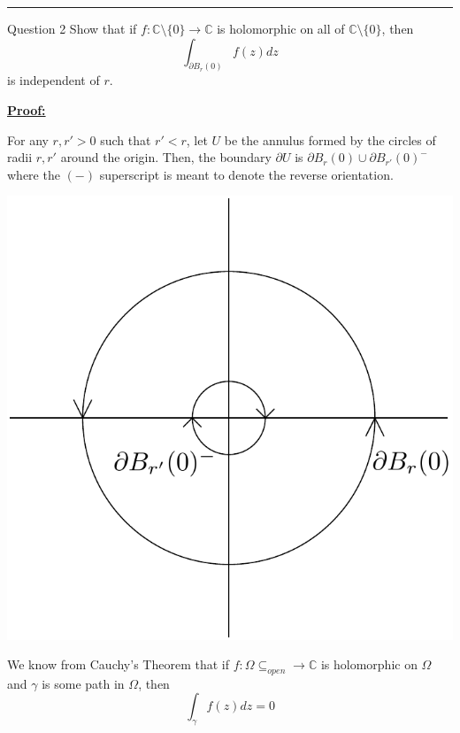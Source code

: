 \documentclass{article}
\newcommand{\C}{\mathbb{C}}
\begin{document}
\vskip 0.5cm
\hrule 
\vskip 0.5cm




\begin{mathdefinitionbox}{Question 2}
\vskip 0.5cm
Show that if $f : \C \setminus \{0\}  \rightarrow \C$ is holomorphic on all of $\C \setminus \{0\}$, then
\[ \int_{\partial B_r(0)} f(z)dz \]
is independent of $r$.
\end{mathdefinitionbox}

\vskip 0.5cm
\underline{\textbf{Proof:}}

For any $r, r' > 0$ such that $r' < r$, let $U$ be the annulus formed by the circles of radii $r, r'$ around the origin. Then, the boundary $\partial U$ is $\partial B_r(0) \cup \partial B_{r'}(0)^{-}$ where the $(-)$ superscript is meant to denote the reverse orientation.

\begin{center}
  \includegraphics[scale=0.35]{Q2.png}
\end{center}

We know from Cauchy's Theorem that if $f : \Omega \subseteq_{open} \rightarrow \C$ is holomorphic on $\Omega$ and $\gamma$ is some path in $\Omega$, then 
\[ \int_{\gamma} f(z) dz = 0 \]
\end{document}
